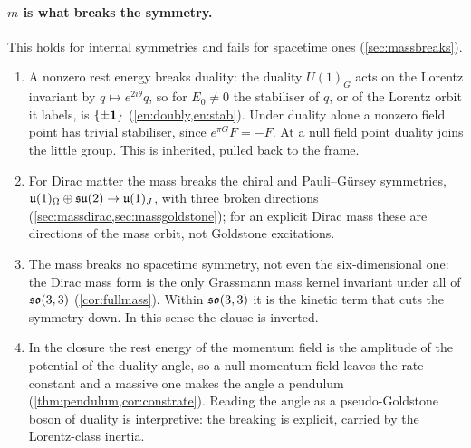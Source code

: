 \paragraph{$m$ is what breaks the symmetry.} This holds for internal symmetries and fails for spacetime ones (\cref{sec:massbreaks}).
\begin{enumerate}[label=(\roman*),leftmargin=2.2em]
\item A nonzero rest energy breaks duality: the duality $U(1)_G$ acts on the Lorentz invariant by $q\mapsto e^{2i\theta}q$, so for $E_0\neq0$ the
stabiliser of $q$, or of the Lorentz orbit it labels, is $\{\pm\mathbf 1\}$ (\cref{en:doubly,en:stab}). Under duality alone a nonzero field point has trivial
stabiliser, since $e^{\pi G}F=-F$. At a null field point duality joins the little group. This is inherited, pulled back to the frame.
\item For Dirac matter the mass breaks the chiral and Pauli--G\"ursey symmetries, $\mathfrak{u}(1)_\Omega\oplus\mathfrak{su}(2)\to\mathfrak{u}(1)_J$, with three broken
directions (\cref{sec:massdirac,sec:massgoldstone}); for an explicit Dirac mass these are directions of the mass orbit, not Goldstone excitations.
\item The mass breaks no spacetime symmetry, not even the six-dimensional one: the Dirac mass form is the only Grassmann mass kernel invariant
under all of $\mathfrak{so}(3,3)$ (\cref{cor:fullmass}). Within $\mathfrak{so}(3,3)$ it is the kinetic term that cuts the symmetry down. In this sense the clause is
inverted.
\item In the closure the rest energy of the momentum field is the amplitude of the potential of the duality angle, so a null momentum field
leaves the rate constant and a massive one makes the angle a pendulum (\cref{thm:pendulum,cor:constrate}). Reading the angle as a
pseudo-Goldstone boson of duality is interpretive: the breaking is explicit, carried by the Lorentz-class inertia.
\end{enumerate}

